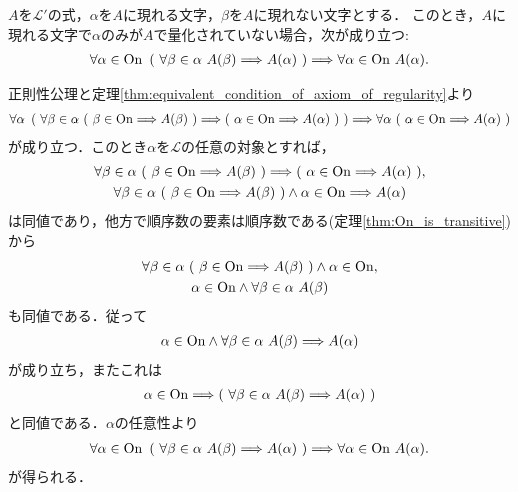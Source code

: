 	\begin{screen}
		\begin{thm}[超限帰納法]\label{thm:transfinite_induction}
			$A$を$\mathcal{L}'$の式，$\alpha$を$A$に現れる文字，$\beta$を$A$に現れない文字とする．
			このとき，$A$に現れる文字で$\alpha$のみが$A$で量化されていない場合，次が成り立つ:
			\begin{align}
				\forall \alpha \in \ON\ 
				\left(\ \forall \beta \in \alpha\ A(\beta)
				\Longrightarrow A(\alpha)\ \right)
				\Longrightarrow \forall \alpha \in \ON\ A(\alpha).
			\end{align}
		\end{thm}
	\end{screen}
	
	\begin{prf}
		正則性公理と定理\ref{thm:equivalent_condition_of_axiom_of_regularity}より
		\begin{align}
			\forall \alpha\ \left(\ \forall \beta \in \alpha\ (\ \beta \in \ON \Longrightarrow A(\beta)\ )
			\Longrightarrow (\ \alpha \in \ON \Longrightarrow A(\alpha)\ )\ \right)
			\Longrightarrow \forall \alpha\ (\ \alpha \in \ON \Longrightarrow A(\alpha)\ )
		\end{align}
		が成り立つ．このとき$\alpha$を$\mathcal{L}$の任意の対象とすれば，
		\begin{align}
			\begin{gathered}
				\forall \beta \in \alpha\ (\ \beta \in \mathrm{On} \Longrightarrow A(\beta)\ )
				\Longrightarrow (\ \alpha \in \mathrm{On} \Longrightarrow A(\alpha)\ ), \\
				\forall \beta \in \alpha\ (\ \beta \in \mathrm{On} \Longrightarrow A(\beta)\ ) \wedge \alpha \in \mathrm{On} \Longrightarrow A(\alpha)
			\end{gathered}
		\end{align}
		は同値であり，他方で順序数の要素は順序数である(定理\ref{thm:On_is_transitive})から
		\begin{align}
			\begin{gathered}
				\forall \beta \in \alpha\ (\ \beta \in \mathrm{On} \Longrightarrow A(\beta)\ ) \wedge \alpha \in \mathrm{On}, \\
				\alpha \in \mathrm{On} \wedge \forall \beta \in \alpha\ A(\beta)
			\end{gathered}
		\end{align}
		も同値である．従って
		\begin{align}
			\alpha \in \mathrm{On} \wedge \forall \beta \in \alpha\ A(\beta)
			\Longrightarrow A(\alpha)
		\end{align}
		が成り立ち，またこれは
		\begin{align}
			\alpha \in \mathrm{On} \Longrightarrow \left(\ \forall \beta \in \alpha\ A(\beta)
			\Longrightarrow A(\alpha)\ \right)
		\end{align}
		と同値である．$\alpha$の任意性より
		\begin{align}
			\forall \alpha \in \ON\ 
			\left(\ \forall \beta \in \alpha\ A(\beta)
			\Longrightarrow A(\alpha)\ \right)
			\Longrightarrow \forall \alpha \in \ON\ A(\alpha).
		\end{align}
		が得られる．
		\QED
	\end{prf}
	
